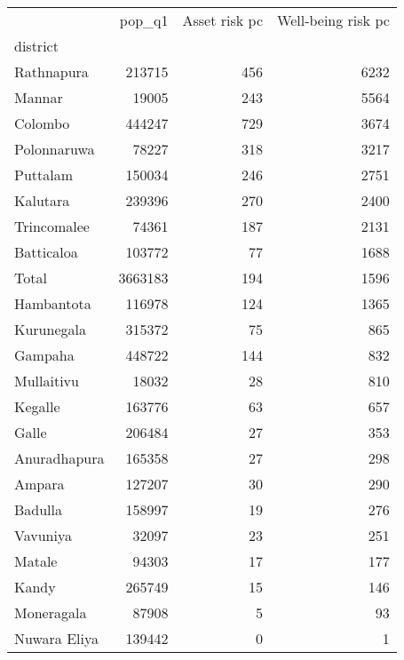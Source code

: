 \begin{tabular}{lrrr}
\toprule
{} &   pop\_q1 &  Asset risk pc &  Well-being risk pc \\
district     &          &                &                     \\
\midrule
Rathnapura   &   213715 &            456 &                6232 \\
Mannar       &    19005 &            243 &                5564 \\
Colombo      &   444247 &            729 &                3674 \\
Polonnaruwa  &    78227 &            318 &                3217 \\
Puttalam     &   150034 &            246 &                2751 \\
Kalutara     &   239396 &            270 &                2400 \\
Trincomalee  &    74361 &            187 &                2131 \\
Batticaloa   &   103772 &             77 &                1688 \\
Total        &  3663183 &            194 &                1596 \\
Hambantota   &   116978 &            124 &                1365 \\
Kurunegala   &   315372 &             75 &                 865 \\
Gampaha      &   448722 &            144 &                 832 \\
Mullaitivu   &    18032 &             28 &                 810 \\
Kegalle      &   163776 &             63 &                 657 \\
Galle        &   206484 &             27 &                 353 \\
Anuradhapura &   165358 &             27 &                 298 \\
Ampara       &   127207 &             30 &                 290 \\
Badulla      &   158997 &             19 &                 276 \\
Vavuniya     &    32097 &             23 &                 251 \\
Matale       &    94303 &             17 &                 177 \\
Kandy        &   265749 &             15 &                 146 \\
Moneragala   &    87908 &              5 &                  93 \\
Nuwara Eliya &   139442 &              0 &                   1 \\
\bottomrule
\end{tabular}
